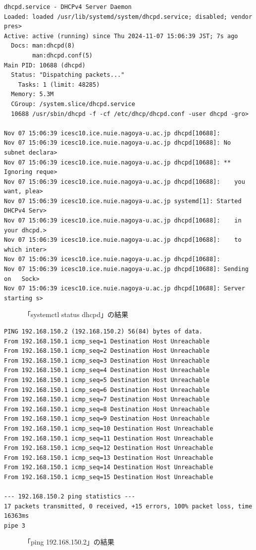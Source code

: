 \documentclass{ltjsarticle} %
\begin{document}
\begin{mdframed}
  \begin{verbatim}
dhcpd.service - DHCPv4 Server Daemon
Loaded: loaded /usr/lib/systemd/system/dhcpd.service; disabled; vendor pres>
Active: active (running) since Thu 2024-11-07 15:06:39 JST; 7s ago
  Docs: man:dhcpd(8)
        man:dhcpd.conf(5)
Main PID: 10688 (dhcpd)
  Status: "Dispatching packets..."
    Tasks: 1 (limit: 48285)
  Memory: 5.3M
  CGroup: /system.slice/dhcpd.service
  10688 /usr/sbin/dhcpd -f -cf /etc/dhcp/dhcpd.conf -user dhcpd -gro>

Nov 07 15:06:39 icesc10.ice.nuie.nagoya-u.ac.jp dhcpd[10688]:
Nov 07 15:06:39 icesc10.ice.nuie.nagoya-u.ac.jp dhcpd[10688]: No subnet declara>
Nov 07 15:06:39 icesc10.ice.nuie.nagoya-u.ac.jp dhcpd[10688]: ** Ignoring reque>
Nov 07 15:06:39 icesc10.ice.nuie.nagoya-u.ac.jp dhcpd[10688]:    you want, plea>
Nov 07 15:06:39 icesc10.ice.nuie.nagoya-u.ac.jp systemd[1]: Started DHCPv4 Serv>
Nov 07 15:06:39 icesc10.ice.nuie.nagoya-u.ac.jp dhcpd[10688]:    in your dhcpd.>
Nov 07 15:06:39 icesc10.ice.nuie.nagoya-u.ac.jp dhcpd[10688]:    to which inter>
Nov 07 15:06:39 icesc10.ice.nuie.nagoya-u.ac.jp dhcpd[10688]:
Nov 07 15:06:39 icesc10.ice.nuie.nagoya-u.ac.jp dhcpd[10688]: Sending on   Sock>
Nov 07 15:06:39 icesc10.ice.nuie.nagoya-u.ac.jp dhcpd[10688]: Server starting s>
  \end{verbatim}
  \end{mdframed}
  \begin{figure}[H]
  \caption{「systemctl status dhcpd」の結果}
  \label{fig:dhcp}
\end{figure}

\begin{mdframed}
  \begin{verbatim}
PING 192.168.150.2 (192.168.150.2) 56(84) bytes of data.
From 192.168.150.1 icmp_seq=1 Destination Host Unreachable
From 192.168.150.1 icmp_seq=2 Destination Host Unreachable
From 192.168.150.1 icmp_seq=3 Destination Host Unreachable
From 192.168.150.1 icmp_seq=4 Destination Host Unreachable
From 192.168.150.1 icmp_seq=5 Destination Host Unreachable
From 192.168.150.1 icmp_seq=6 Destination Host Unreachable
From 192.168.150.1 icmp_seq=7 Destination Host Unreachable
From 192.168.150.1 icmp_seq=8 Destination Host Unreachable
From 192.168.150.1 icmp_seq=9 Destination Host Unreachable
From 192.168.150.1 icmp_seq=10 Destination Host Unreachable
From 192.168.150.1 icmp_seq=11 Destination Host Unreachable
From 192.168.150.1 icmp_seq=12 Destination Host Unreachable
From 192.168.150.1 icmp_seq=13 Destination Host Unreachable
From 192.168.150.1 icmp_seq=14 Destination Host Unreachable
From 192.168.150.1 icmp_seq=15 Destination Host Unreachable

--- 192.168.150.2 ping statistics ---
17 packets transmitted, 0 received, +15 errors, 100% packet loss, time 16363ms
pipe 3
  \end{verbatim}
  \end{mdframed}
  \begin{figure}[H]
  \caption{「ping 192.168.150.2」の結果}
  \label{fig:ping2}
\end{figure}
\end{document}
